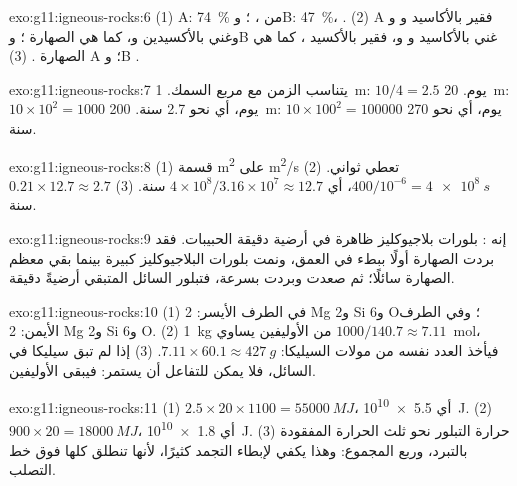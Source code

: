 \begin{solution}{exo:g11:igneous-rocks:6}
(1) A: \qty{74}{\percent} من ، ؛ وB: \qty{47}{\percent}، .
(2) A فقير بالأكاسيد  و و وغني بالأكسيدين 
و، كما هي الصهارة ؛ وB غني بالأكاسيد  و و،
فقير بالأكسيد ، كما هي الصهارة . (3) A ؛ وB .
\end{solution}

\begin{solution}{exo:g11:igneous-rocks:7}
يتناسب الزمن مع مربع السمك. \qty{1}{m}: $10/4 = 2.5$
يوم. \qty{20}{m}: $10 \times 10^2 = 1000$ يوم، أي نحو 2.7 سنة.
\qty{200}{m}: $10 \times 100^2 = \num{100000}$ يوم، أي نحو 270 سنة.
\end{solution}

\begin{solution}{exo:g11:igneous-rocks:8}
(1) قسمة \unit{m^2} على \unit{m^2/s} تعطي ثواني. (2) $400/10^{-6} =
\qty{4e8}{s}$، أي $4 \times 10^8 / 3.16 \times 10^7 \approx 12.7$
سنة. (3) $0.21 \times 12.7 \approx 2.7$ سنة.
\end{solution}

\begin{solution}{exo:g11:igneous-rocks:9}
إنه : بلورات بلاجيوكليز ظاهرة في أرضية دقيقة الحبيبات.
فقد بردت الصهارة أولًا ببطء في العمق، ونمت بلورات البلاجيوكليز
كبيرة بينما بقي معظم الصهارة سائلًا؛ ثم صعدت وبردت بسرعة،
فتبلور السائل المتبقي أرضيةً دقيقة.
\end{solution}

\begin{solution}{exo:g11:igneous-rocks:10}
(1) في الطرف الأيسر: 2 Mg و2 Si و6 O؛ وفي الطرف الأيمن: 2 Mg و2 Si و6 O. (2) \qty{1}{kg} من
الأوليفين يساوي $1000/140.7 \approx 7.11$~\unit{mol}، فيأخذ العدد نفسه من مولات
السيليكا: $7.11 \times 60.1 \approx \qty{427}{g}$. (3) إذا لم تبق سيليكا في
السائل، فلا يمكن للتفاعل أن يستمر: فيبقى الأوليفين.
\end{solution}

\begin{solution}{exo:g11:igneous-rocks:11}
(1) $2.5 \times 20 \times 1100 = \qty{55000}{MJ}$، أي \qty{5.5e10}{J}.
(2) $900 \times 20 = \qty{18000}{MJ}$، أي \qty{1.8e10}{J}. (3) حرارة
التبلور نحو ثلث الحرارة المفقودة بالتبرد، وربع
المجموع: وهذا يكفي لإبطاء التجمد كثيرًا، لأنها تنطلق كلها
فوق خط التصلب.
\end{solution}

